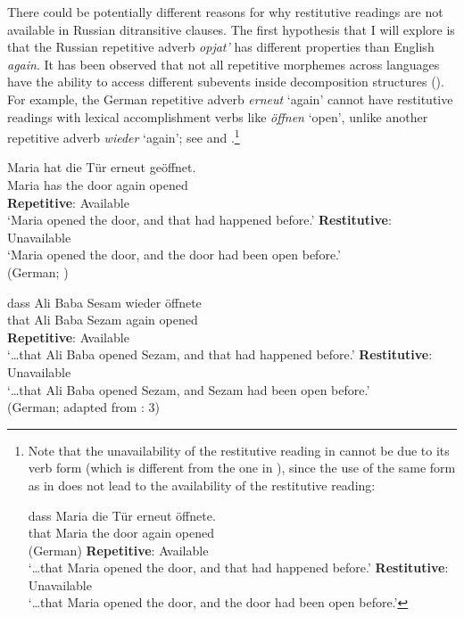 \documentclass[output=paper]{langscibook}
\begin{document}
There could be potentially different reasons for why restitutive readings are not available in Russian ditransitive clauses. The first hypothesis that I will explore is that the Russian repetitive adverb \textit{opjat’} has different properties than English \textit{again}. It has been observed that not all repetitive morphemes across languages have the ability to access different subevents inside decomposition structures (\citealt{Rapp-vonStechow1999,Beck2005,Alexiadou-etal2014,Lechner-etal2015}). For example, the German repetitive adverb \textit{erneut} ‘again’ cannot have restitutive readings with lexical accomplishment verbs like \textit{öffnen} ‘open’, unlike another repetitive adverb \textit{wieder} ‘again’; see  and .\footnote{Note that the unavailability of the restitutive reading in  cannot be due to its verb form (which is different from the one in ), since the use of the same form as in  does not lead to the availability of the restitutive reading:

\ea\label{ex:bondarenko:fn7exi}
\gll {\dots} dass Maria die Tür erneut öffnete.\\
{} that Maria the door again opened \\\hfill (German)
\ea     \textbf{Repetitive}: Available\\
`\dots that Maria opened the door, and that had happened before.'
\ex     \textbf{Restitutive}: Unavailable\\
`\dots that Maria opened the door, and the door had been open before.'
\z
\z
}


 \ea\label{ex:bondarenko:13}
\gll Maria hat die Tür erneut geöffnet.\\
     Maria has the door again opened\\
\ea \textbf{Repetitive}: Available\\
`Maria opened the door, and that had happened before.'
\ex \textbf{Restitutive}: Unavailable\\
`Maria opened the door, and the door had been open before.'\\
\hfill({German}; \citealt[12]{Beck2005})
\z
\z

 \ea\label{ex:bondarenko:14}
\gll {\dots} dass Ali Baba Sesam wieder öffnete\\
    {} that Ali Baba Sezam again opened\\
\ea \textbf{Repetitive}: Available\\
`\dots that Ali Baba opened Sezam, and that had happened before.'
\ex \textbf{Restitutive}: Unavailable\\
`\dots that Ali Baba opened Sezam, and Sezam had been open before.'\\
\hfill (German; adapted from \citealt{vonStechow1996}: 3)
\z
\z
\end{document}
